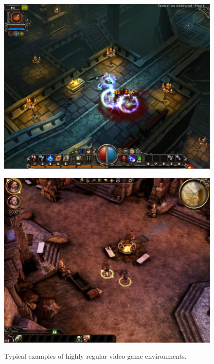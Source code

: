 \begin{figure}[h]
   \centering
    \begin{minipage}{0.47\columnwidth}
		\label{fig:ra3}
		\centering
			\includegraphics[width=\columnwidth]{diagrams/torchlight.jpg}
	\end{minipage}
  \hspace{0.35em}
    \begin{minipage}{0.47\columnwidth}
		\label{fig:ra3u}
		\centering
			\includegraphics[width=\columnwidth]{diagrams/da.jpg}
	\end{minipage}
\caption{Typical examples of highly regular video game environments.}

 \end{figure}

